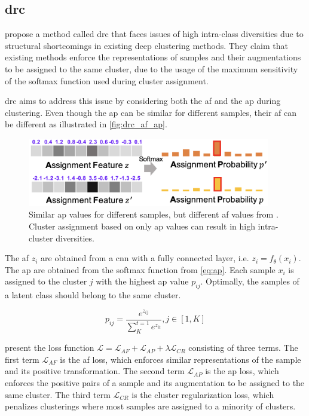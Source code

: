 \subsection{\acl{drc}}\label{subsec:drc}

\citeauthor{DRC_2020} propose a method called \ac{drc} 
that faces issues of high intra-class diversities 
due to structural shortcomings in existing deep clustering methods.
They claim that existing methods enforce the representations of samples 
and their augmentations to be assigned to the same cluster,
due to the usage of the maximum sensitivity of the softmax function used during cluster assignment.

\ac{drc} aims to address this issue by considering both the \ac{af} and the \ac{ap} during clustering.
Even though the \ac{ap} can be similar for different samples, their \ac{af} can be different 
as illustrated in \autoref{fig:drc_af_ap}.

\begin{figure}[!htb] %
    \centering
    \includegraphics[width=300pt]{images/DRC_af_ap.png}
    \caption{Similar \ac{ap} values for different samples, but different \ac{af} values from \citet{DRC_2020}.
    Cluster assignment based on only \ac{ap} values can result in high intra-cluster diversities.}
    \label{fig:drc_af_ap}
\end{figure}

The \ac{af} $z_i$ are obtained from a \ac{cnn} with a fully connected layer, i.e. $z_i = f_\theta(x_i)$.
The \ac{ap} are obtained from the softmax function from \eqref{eq:ap}. 
Each sample $x_i$ is assigned to the cluster $j$ with the highest \ac{ap} value $p_{ij}$.
Optimally, the samples of a latent class should belong to the same cluster.

\begin{equation}
    p_{ij} = \frac{e^{z_{ij}}}{\sum_{K}^{t=1}e^{z_{it}}}, j \in \left[1,K\right]
    \label{eq:ap}
\end{equation}

\citeauthor{DRC_2020} present the loss function $\mathcal{L} = \mathcal{L}_{AF} + \mathcal{L}_{AP}  + \lambda \mathcal{L}_{CR}$  consisting of three terms.
The first term $\mathcal{L}_{AF}$ is the \ac{af} loss, which enforces similar representations of the sample and its positive transformation.
The second term $\mathcal{L}_{AP}$ is the \ac{ap} loss, which enforces the positive pairs of a sample and its augmentation 
to be assigned to the same cluster.
The third term $\mathcal{L}_{CR}$ is the cluster regularization loss, which penalizes clusterings where most samples are assigned to a minority of clusters.